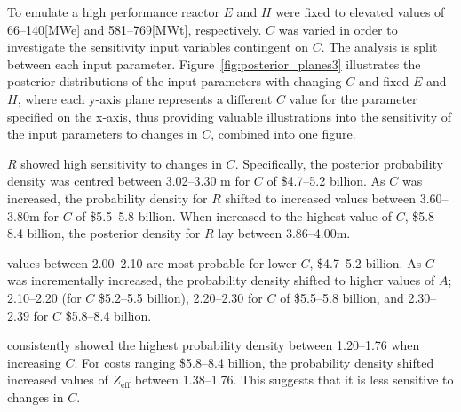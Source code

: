 \documentclass[journal]{IEEEtran}
\begin{document}




To emulate a high performance reactor $E$ and $H$ were fixed to elevated values of 66--140[MWe] and 581--769[MWt], respectively. $C$ was varied in order to investigate the sensitivity input variables contingent on $C$. The analysis is split between each input parameter. Figure~\ref{fig:posterior_planes3} illustrates the posterior distributions of the input parameters with changing $C$ and fixed $E$ and $H$, where each y-axis plane represents a different $C$ value for the parameter specified on the x-axis, thus providing valuable illustrations into the sensitivity of the input parameters to changes in $C$, combined into one figure. 

\textbf{$R$} showed high sensitivity to changes in $C$. Specifically, the posterior probability density was centred between 3.02--3.30 m for $C$ of \$4.7--5.2 billion. As $C$ was increased, the probability density for $R$ shifted to increased values between 3.60--3.80m for $C$ of \$5.5--5.8 billion. When increased to the highest value of $C$, \$5.8--8.4 billion, the posterior density for $R$ lay between 3.86--4.00m. 

 values between 2.00--2.10 are most probable for lower $C$, \$4.7--5.2 billion. As $C$ was incrementally increased, the probability density shifted to higher values of $A$; 2.10--2.20 (for $C$ \$5.2--5.5 billion), 2.20--2.30 for $C$ of \$5.5--5.8 billion, and 2.30--2.39 for $C$ \$5.8--8.4 billion.  

 consistently showed the highest probability density between 1.20--1.76 when increasing $C$. For costs ranging \$5.8--8.4 billion, the probability density shifted increased values of $Z_{\text{eff}}$ between 1.38--1.76. This suggests that it is less sensitive to changes in $C$.
\end{document}
